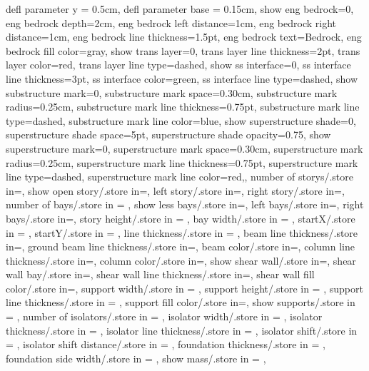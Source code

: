{{  defl parameter y = 0.5cm,
  defl parameter base = 0.15cm,
  show eng bedrock=0,
  eng bedrock depth=2cm,
  eng bedrock left distance=1cm,
  eng bedrock right distance=1cm,
  eng bedrock line thickness=1.5pt,
  eng bedrock text=Bedrock,
  eng bedrock fill color=gray,
  show trans layer=0,
  trans layer line thickness=2pt,
  trans layer color=red,
  trans layer line type=dashed,
  show ss interface=0,
  ss interface line thickness=3pt,
  ss interface color=green,
  ss interface line type=dashed,
  show substructure mark=0,
  substructure mark space=0.30cm,
  substructure mark radius=0.25cm,
  substructure mark line thickness=0.75pt,
  substructure mark line type=dashed,
  substructure mark line color=blue,
  show superstructure shade=0,
  superstructure shade space=5pt,
  superstructure shade opacity=0.75,
  show superstructure mark=0,
  superstructure mark space=0.30cm,
  superstructure mark radius=0.25cm,
  superstructure mark line thickness=0.75pt,
  superstructure mark line type=dashed,
  superstructure mark line color=red,},
  number of storys/.store in=\storynumber,
  show open story/.store in=\showopenstory,
  left story/.store in=\leftstory,
  right story/.store in=\rightstory,
  number of bays/.store in = \baynumber,
  show less bays/.store in=\showlessbays,
  left bays/.store in=\leftbays,
  right bays/.store in=\rightbays,
  story height/.store in = \storyheight,
  bay width/.store in = \baywidth,
  startX/.store in = \startx,
  startY/.store in = \starty,
  line thickness/.store in = \linet,
  beam line thickness/.store in=\beamlinet,
  ground beam line thickness/.store in=\groundbeamlinet,
  beam color/.store in=\beamcolor,
  column line thickness/.store in=\collinet,
  column color/.store in=\columncolor,
  show shear wall/.store in=\showshearwall,
  shear wall bay/.store in=\shearwallbay,
  shear wall line thickness/.store in=\shearwalllinet,
  shear wall fill color/.store in=\shearwallfillcolor,
  support width/.store in = \supportwidth,
  support height/.store in = \supportheight,
  support line thickness/.store in = \baselinet,
  support fill color/.store in=\supportfillcolor,
  show supports/.store in = \showsupports,
  number of isolators/.store in = \numberofisolators,
  isolator width/.store in = \isolationwidth,
  isolator thickness/.store in = \isolationdepth,
  isolator line thickness/.store in = \isolinet,
  isolator shift/.store in = \isoshiftyn,
  isolator shift distance/.store in = \isoshift,
  foundation thickness/.store in = \foundationdepth,
  foundation side width/.store in = \foundsidew,
  show mass/.store in = \showmass,
}
